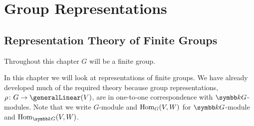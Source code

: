 \part{Group Representations}
\chapter{Representation Theory of Finite Groups}
Throughout this chapter \(G\) will be a finite group.

In this chapter we will look at representations of finite groups.
We have already developed much of the required theory because group representations, \(\rho \colon G \to \generalLinear(V)\), are in one-to-one correspondence with \(\field G\)-modules.
Note that we write \(G\)-module and \(\operatorname{Hom}_{G}(V, W)\) for \(\field G\)-module and \(\Hom_{\field G}(V, W)\).

